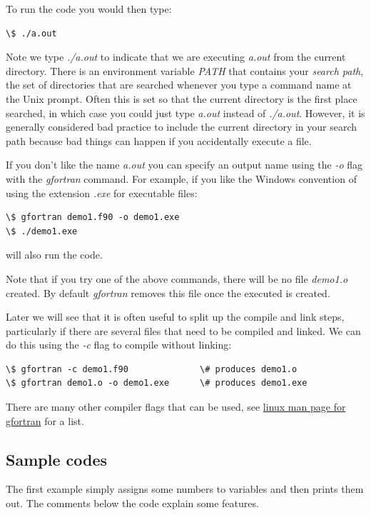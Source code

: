 \documentclass[letterpaper,10pt,english]{sphinxmanual}
\begin{document}
To run the code you would then type:

\begin{Verbatim}[commandchars=\\\{\}]
\$ ./a.out
\end{Verbatim}

Note we type \emph{./a.out} to indicate that we are executing \emph{a.out} from
the current directory.  There is an environment variable \emph{PATH} that
contains your \emph{search path}, the set of directories that are searched
whenever you type a command name at the Unix prompt.  Often this is
set so that the current directory is the first place searched, in
which case you could just type \emph{a.out} instead of \emph{./a.out}.
However, it is generally considered bad practice to include the
current directory in your search path because bad things can happen
if you accidentally execute a file.

If you don't like the name \emph{a.out} you can specify an output name
using the \emph{-o} flag with the \emph{gfortran} command.  For example,
if you like the Windows convention of using the extension \emph{.exe} for
executable files:

\begin{Verbatim}[commandchars=\\\{\}]
\$ gfortran demo1.f90 -o demo1.exe
\$ ./demo1.exe
\end{Verbatim}

will also run the code.

Note that if you try one of the above commands, there will be no file
\emph{demo1.o} created.  By default \emph{gfortran} removes this file once the
executed is created.

Later we will see that it is often useful to split up the compile and
link steps, particularly if there are several files that need to be
compiled and linked.  We can do this using the \emph{-c} flag to compile
without linking:

\begin{Verbatim}[commandchars=\\\{\}]
\$ gfortran -c demo1.f90              \# produces demo1.o
\$ gfortran demo1.o -o demo1.exe      \# produces demo1.exe
\end{Verbatim}

There are many other compiler flags that can be used, see
\href{http://linux.die.net/man/1/gfortran}{linux man page for gfortran} for a list.


\subsection{Sample codes}
\label{fortran:fortran-ex1}\label{fortran:sample-codes}
The first example simply assigns some numbers to variables and then
prints them out.   The comments below the code explain some features.
\end{document}
